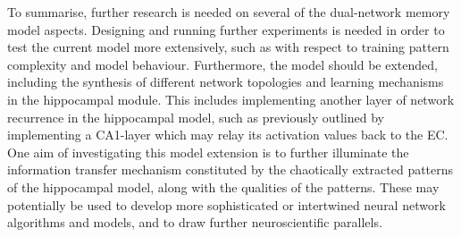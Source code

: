 To summarise, further research is needed on several of the dual-network memory model aspects. Designing and running further experiments is needed in order to test the current model more extensively, such as with respect to training pattern complexity and model behaviour. Furthermore, the model should be extended, including the synthesis of different network topologies and learning mechanisms in the hippocampal module. This includes implementing another layer of network recurrence in the hippocampal model, such as previously outlined by implementing a CA1-layer which may relay its activation values back to the EC.
One aim of investigating this model extension is to further illuminate the information transfer mechanism constituted by the chaotically extracted patterns of the hippocampal model, along with the qualities of the patterns. These may potentially be used to develop more sophisticated or intertwined neural network algorithms and models, and to draw further neuroscientific parallels.







\cleardoublepage